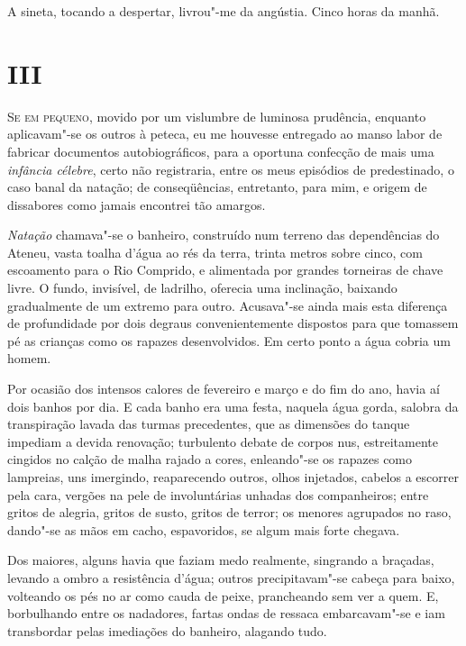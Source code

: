 A sineta, tocando a despertar, livrou"-me
da angústia. Cinco horas da manhã. 

\section{III}

\noindent\textsc{Se em pequeno}, movido por um vislumbre de luminosa prudência, enquanto
aplicavam"-se os outros à peteca, eu me houvesse entregado ao manso
labor de fabricar documentos autobiográficos, para a oportuna confecção
de mais uma \textit{infância célebre}, certo não registraria, entre os meus
episódios de predestinado, o caso banal da natação; de conseqüências,
entretanto, para mim, e origem de dissabores como jamais encontrei tão amargos.
 
\textit{Natação} chamava"-se o banheiro, construído num terreno das dependências do 
Ateneu, vasta toalha d'água ao rés da terra, trinta metros sobre cinco, 
com escoamento para o Rio Comprido, e alimentada por grandes torneiras de
chave livre. O fundo, invisível, de ladrilho, oferecia uma inclinação,
baixando gradualmente de um extremo para outro. Acusava"-se ainda mais
esta diferença de profundidade por dois degraus convenientemente
dispostos para que tomassem pé as crianças como os rapazes
desenvolvidos. Em certo ponto a água cobria um homem. 


Por ocasião dos
intensos calores de fevereiro e março e do fim do ano, havia aí dois
banhos por dia. E cada banho era uma festa, naquela água gorda, salobra
da transpiração lavada das turmas precedentes, que as dimensões do
tanque impediam a devida renovação; turbulento debate de corpos nus,
estreitamente cingidos no calção de malha rajado a cores, enleando"-se
os rapazes como lampreias, uns imergindo, reaparecendo outros, olhos
injetados, cabelos a escorrer pela cara, vergões na pele de
involuntárias unhadas dos companheiros; entre gritos de alegria, gritos
de susto, gritos de terror; os menores agrupados no raso, dando"-se as
mãos em cacho, espavoridos, se algum mais forte chegava. 


Dos maiores, alguns havia que faziam medo realmente, singrando a braçadas, 
levando a ombro a resistência d'água; outros precipitavam"-se cabeça para baixo,
volteando os pés no ar como cauda de peixe, prancheando sem ver a quem.
E, borbulhando entre os nadadores, fartas ondas de ressaca
embarcavam"-se e iam transbordar pelas imediações do banheiro,
alagando tudo. 

